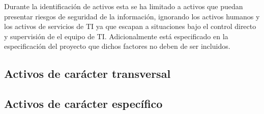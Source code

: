 Durante la identificación de activos esta se ha limitado a activos que puedan presentar riesgos de seguridad de la información, ignorando los activos humanos y los activos de servicios de TI ya que escapan a situaciones bajo el control directo y supervisión de el equipo de TI. Adicionalmente está especificado en la especificación del proyecto que dichos factores no deben de ser incluidos.

\subsection{Activos de carácter transversal}




\subsection{Activos de carácter específico}
